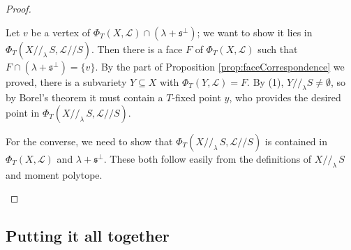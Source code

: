 \documentclass[11pt]{amsart}
\theoremstyle{definition}
\newcommand\lie[1]{{\mathfrak #1}}
\newcommand\calL{{\mathcal L}}
\begin{document}
\begin{proof}
\begin{enumerate}
    Let $v$ be a vertex of $\Phi_T(X,\calL) \cap (\lambda+\lie s^\perp)$;
    we want to show it lies in $\Phi_T(X//_\lambda\, S,\calL//S)$.
    Then there is a face $F$ of $\Phi_T(X,\calL)$ such that
    $F \cap (\lambda+\lie s^\perp) = \{v\}$.
    By the part of Proposition \ref{prop:faceCorrespondence} we proved,
    there is a subvariety $Y \subseteq X$ with $\Phi_T(Y,\calL) = F$.
    By (1), $Y//_\lambda S \neq \emptyset$, so by Borel's theorem
    it must contain a $T$-fixed point $y$, who provides the desired point
    in $\Phi_T(X//_\lambda\, S,\calL//S)$.

    For the converse, we need to show that
    $\Phi_T(X//_\lambda\, S,\calL//S)$ is contained in
    $\Phi_T(X, \calL)$ and $\lambda + \lie s^\perp$. These both follow
    easily from the definitions of $X//_\lambda\, S$ and moment polytope.
    \qedhere
  \end{enumerate}
\end{proof}

\subsection{Putting it all together}
\end{document}
